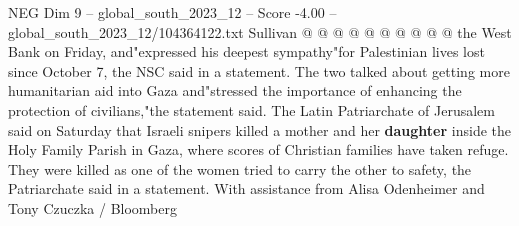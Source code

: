 \begin{textsample}{NEG Dim 9 – global\_south\_2023\_12 – Score -4.00 – global\_south\_2023\_12/104364122.txt}
Sullivan @ @ @ @ @ @ @ @ @ @ the West Bank on Friday, and"expressed his deepest sympathy"for Palestinian lives lost since October 7, the NSC said in a statement.
The two talked about getting more humanitarian aid into Gaza and"stressed the importance of enhancing the protection of civilians,"the statement said.
The Latin Patriarchate of Jerusalem said on Saturday that Israeli snipers killed a mother and her \textbf{daughter} inside the Holy Family Parish in Gaza, where scores of Christian families have taken refuge.
They were killed as one of the women tried to carry the other to safety, the Patriarchate said in a statement.
With assistance from Alisa Odenheimer and Tony Czuczka / Bloomberg

\end{textsample}
